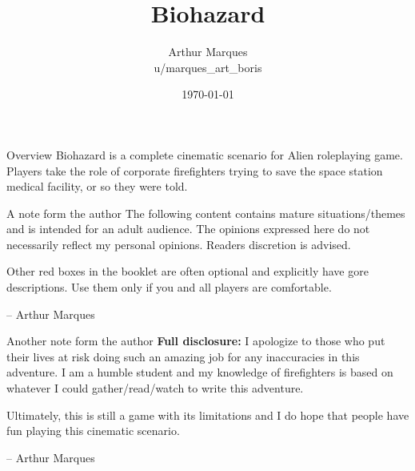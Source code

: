 \documentclass[10pt,twoside,twocolumn]{book}
\title{Biohazard}
\date{\today}
\author{Arthur Marques \\ u/marques\_art\_boris}
\begin{document}
\selectfont %
\frontmatter

\maketitle


\begin{rpg-commentbox}{Overview}
  Biohazard is a complete cinematic scenario for Alien roleplaying game. Players take the role of corporate firefighters trying to save the space station medical facility, or so they were told.
\end{rpg-commentbox}



\begin{rpg-warnbox}{A note form the author}
  The following content contains mature situations/themes and is intended for an adult audience. The opinions expressed here do not necessarily reflect my personal opinions. Readers discretion is advised.

  Other red boxes in the booklet are often optional and explicitly have gore descriptions. Use them only if you and all players are comfortable.

  \begin{flushright}
  -- Arthur Marques
  \end{flushright}
\end{rpg-warnbox}


\medskip
\begin{rpg-warnbox}{Another note form the author}
  \textbf{Full disclosure:} I apologize to those who put their lives at risk doing such an amazing job for any inaccuracies in this adventure. I am a humble student and my knowledge of firefighters is based on whatever I could gather/read/watch to write this adventure. 
  
  Ultimately, this is still a game with its limitations and I do hope that people have fun playing this cinematic scenario.
  \begin{flushright}
  -- Arthur Marques
  \end{flushright}
\end{rpg-warnbox}


\tableofcontents

\mainmatter

\end{document}
